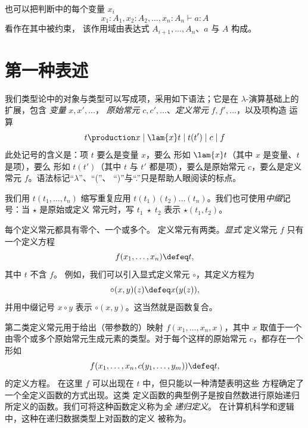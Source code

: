 也可以把判断中的每个变量 $x_i$
\[
  x_1:A_1, x_2:A_2,\dots,x_n:A_n \vdash a : A
\]
看作在其中被约束，
%
%
该作用域由表达式 $A_{i+1},
\ldots, A_n$、$a$ 与 $A$ 构成。
\section{第一种表述}
\label{sec:syntax-informally}

我们类型论中的对象与类型可以写成项，采用如下语法；它是在 $\lambda$-演算基础上的扩展，包含
\emph{变量} $x, x',\dots$，
%
\emph{原始常元}
%
%
$c,c',\dots$、\emph{定义常元} $f,f',\dots$，以及项构造
运算
%
\[
  t \production x \mid \lam{x} t \mid t(t') \mid c \mid f
\]
%
此处记号的含义是：项 $t$ 要么是变量 $x$，要么
形如 $\lam{x} t$（其中 $x$ 是变量、$t$ 是项），要么
形如 $t(t')$（其中 $t$ 与 $t'$ 都是项），要么是原始常元
$c$，要么是定义常元 $f$。语法标记“$\lambda$”、“(”、
“)”与“.”只是帮助人眼阅读的标点。

我们用 $t(t_1,\dots,t_n)$ 缩写重复应用
$t(t_1)(t_2)\dots (t_n)$。我们也可使用\emph{中缀}记号：当 $\star$ 是原始或定义
常元时，写 $t_1\;
\star\; t_2$ 表示 $\star(t_1,t_2)$。

每个定义常元都具有零个、一个或多个。
%
%
定义常元有两类。\emph{显式}
定义常元 $f$ 只有一个定义方程
  \[ f(x_1,\dots,x_n)\defeq t,\]
其中 $t$ 不含 $f$。
%
例如，我们可以引入显式定义常元 $\circ$，其定义方程为
  \[ \circ (x,y)(z) \defeq x(y(z)),\]
并用中缀记号 $x\circ y$ 表示 $\circ(x,y)$。这当然就是函数复合。

第二类定义常元用于给出（带参数的）映射
$f(x_1,\dots,x_n,x)$，其中 $x$ 取值于一个由零个或多个原始常元生成元素的类型。对于每个这样的原始常元 $c$，都存在一个形如
\[
  f(x_1,\dots,x_n,c(y_1,\dots,y_m)) \defeq t,
\]
的定义方程。
在这里 $f$ 可以出现在 $t$ 中，但只能以一种清楚表明这些
方程确定了一个全定义函数的方式出现。这类
定义函数的典型例子是按自然数进行原始递归所定义的函数。我们可将这种函数定义称为\emph{全
  递归定义}。
%
在计算机科学和逻辑中，这种在递归数据类型上对函数的定义
被称为。
%
%
%


